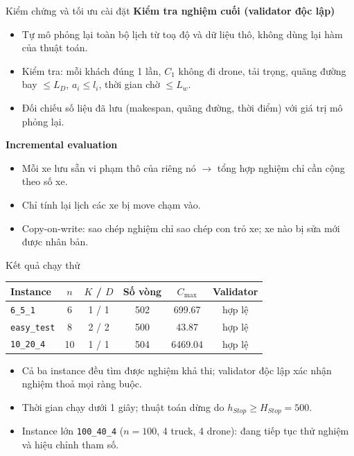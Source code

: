 \documentclass[aspectratio=169]{beamer}
\begin{document}
\begin{frame}{Kiểm chứng và tối ưu cài đặt}
  \textbf{Kiểm tra nghiệm cuối (validator độc lập)}
  \begin{itemize}
    \item \small Tự mô phỏng lại toàn bộ lịch từ toạ độ và dữ liệu thô, không dùng lại hàm của thuật toán.
    \item \small Kiểm tra: mỗi khách đúng 1 lần, $C_1$ không đi drone, tải trọng, quãng đường bay $\le L_D$, $a_i \le l_i$, thời gian chờ $\le L_w$.
    \item \small Đối chiếu số liệu đã lưu (makespan, quãng đường, thời điểm) với giá trị mô phỏng lại.
  \end{itemize}

  \vspace{2mm}
  \textbf{Incremental evaluation}
  \begin{itemize}
    \item \small Mỗi xe lưu sẵn vi phạm thô của riêng nó $\to$ tổng hợp nghiệm chỉ cần cộng theo số xe.
    \item \small Chỉ tính lại lịch các xe bị move chạm vào.
    \item \small Copy-on-write: sao chép nghiệm chỉ sao chép con trỏ xe; xe nào bị sửa mới được nhân bản.
  \end{itemize}
\end{frame}

\begin{frame}{Kết quả chạy thử}
  \centering
  \begin{tabular}{lccccc}
    \toprule
    Instance & $n$ & $K$ / $D$ & Số vòng & $C_{\max}$ & Validator \\
    \midrule
    \texttt{6\_5\_1}     & 6  & 1 / 1 & 502 & 699.67  & hợp lệ \\
    \texttt{easy\_test}  & 8  & 2 / 2 & 500 & 43.87   & hợp lệ \\
    \texttt{10\_20\_4}   & 10 & 1 / 1 & 504 & 6469.04 & hợp lệ \\
    \bottomrule
  \end{tabular}

  \vspace{3mm}
  \begin{itemize}
    \item \small Cả ba instance đều tìm được nghiệm khả thi; validator độc lập xác nhận nghiệm thoả mọi ràng buộc.
    \item \small Thời gian chạy dưới 1 giây; thuật toán dừng do $h_{Stop} \ge H_{Stop} = 500$.
    \item \small Instance lớn \texttt{100\_40\_4} ($n = 100$, 4 truck, 4 drone): đang tiếp tục thử nghiệm và hiệu chỉnh tham số.
  \end{itemize}
\end{frame}
\end{document}

